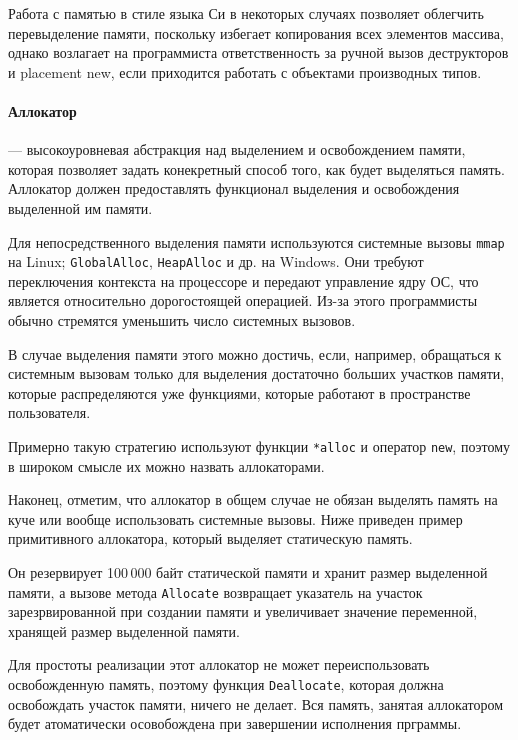 \documentclass[14pt, a4paper]{extarticle}
\begin{document}
Работа с памятью в стиле языка Си в некоторых случаях позволяет облегчить
перевыделение памяти, поскольку избегает копирования всех элементов массива,
однако возлагает на программиста ответственность за ручной вызов деструкторов
и placement new, если приходится работать с объектами производных типов.

\paragraph{Аллокатор} --- высокоуровневая абстракция над выделением и освобождением памяти,
которая позволяет задать конекретный способ того, как будет выделяться память. Аллокатор
должен предоставлять функционал выделения и освобождения выделенной им памяти.

Для непосредственного выделения памяти используются системные вызовы
\verb|mmap| на Linux; \verb|GlobalAlloc|, \verb|HeapAlloc| и др. на Windows.
Они требуют переключения контекста на процессоре и передают управление ядру ОС,
что является относительно дорогостоящей операцией. Из-за этого программисты обычно
стремятся уменьшить число системных вызовов.

В случае выделения памяти этого можно достичь, если, например, обращаться к системным вызовам
только для выделения достаточно больших участков памяти, которые распределяются уже функциями,
которые работают в пространстве пользователя.

Примерно такую стратегию используют функции \verb|*alloc| и оператор \verb|new|, поэтому
в широком смысле их можно назвать аллокаторами.

Наконец, отметим, что аллокатор в общем случае не обязан выделять память на куче или вообще использовать
системные вызовы. Ниже приведен пример примитивного аллокатора, который выделяет статическую память.

Он резервирует 100\,000 байт статической памяти и хранит размер
выделенной памяти, а вызове метода \verb|Allocate| возвращает указатель на участок
зарезрвированной при создании памяти и увеличивает значение переменной, хранящей
размер выделенной памяти.

Для простоты реализации этот аллокатор не может переиспользовать освобожденную память,
поэтому функция \verb|Deallocate|, которая должна освобождать участок памяти, ничего не
делает. Вся память, занятая аллокатором будет атоматически осовобождена при завершении исполнения прграммы.
\end{document}
